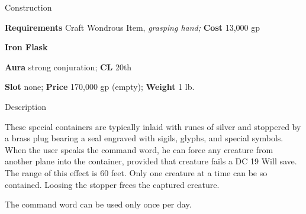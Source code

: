 Construction
				
\textbf{Requirements} Craft Wondrous Item,\textit{ grasping hand;}\textbf{ Cost }13,000 gp
				
\textbf{Iron Flask}
				
\textbf{Aura} strong conjuration;\textbf{ CL }20th
				
\textbf{Slot} none; \textbf{Price} 170,000 gp (empty); \textbf{Weight} 1 lb.
				
Description
				
These special containers are typically inlaid with runes of silver and stoppered by a brass plug bearing a seal engraved with sigils, glyphs, and special symbols. When the user speaks the command word, he can force any creature from another plane into the container, provided that creature fails a DC 19 Will save. The range of this effect is 60 feet. Only one creature at a time can be so contained. Loosing the stopper frees the captured creature. 
				
The command word can be used only once per day.
				
